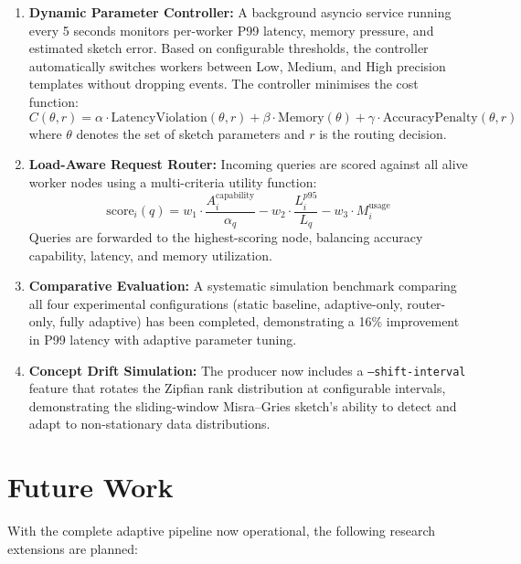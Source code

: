\begin{enumerate}
    \item \textbf{Dynamic Parameter Controller:} A background asyncio service running every 5 seconds monitors per-worker P99 latency, memory pressure, and estimated sketch error. Based on configurable thresholds, the controller automatically switches workers between Low, Medium, and High precision templates without dropping events. The controller minimises the cost function:
    \begin{equation}
        C(\theta, r) = \alpha \cdot \text{LatencyViolation}(\theta, r) + \beta \cdot \text{Memory}(\theta) + \gamma \cdot \text{AccuracyPenalty}(\theta, r)
    \end{equation}
    where $\theta$ denotes the set of sketch parameters and $r$ is the routing decision.

    \item \textbf{Load-Aware Request Router:} Incoming queries are scored against all alive worker nodes using a multi-criteria utility function:
    \begin{equation}
        \text{score}_i(q) = w_1 \cdot \frac{A_i^{\text{capability}}}{\alpha_q} - w_2 \cdot \frac{L_i^{p95}}{L_q} - w_3 \cdot M_i^{\text{usage}}
    \end{equation}
    Queries are forwarded to the highest-scoring node, balancing accuracy capability, latency, and memory utilization.

    \item \textbf{Comparative Evaluation:} A systematic simulation benchmark comparing all four experimental configurations (static baseline, adaptive-only, router-only, fully adaptive) has been completed, demonstrating a 16\% improvement in P99 latency with adaptive parameter tuning.

    \item \textbf{Concept Drift Simulation:} The producer now includes a \texttt{--shift-interval} feature that rotates the Zipfian rank distribution at configurable intervals, demonstrating the sliding-window Misra--Gries sketch's ability to detect and adapt to non-stationary data distributions.
\end{enumerate}

\section{Future Work}

With the complete adaptive pipeline now operational, the following research extensions are planned:

